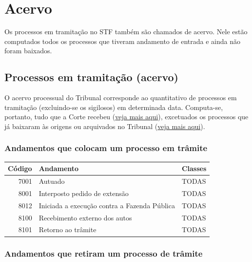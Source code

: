 \documentclass[
]{book}
\begin{document}
\hypertarget{acervo}{%
\chapter{Acervo}\label{acervo}}

Os processos em tramitação no STF também são chamados de acervo. Nele estão computados todos os processos que tiveram andamento de entrada e ainda não foram baixados.

\hypertarget{processos-em-tramitauxe7uxe3o-acervo}{%
\section{Processos em tramitação (acervo)}\label{processos-em-tramitauxe7uxe3o-acervo}}

O acervo processual do Tribunal corresponde ao quantitativo de processos em tramitação (excluindo-se os sigilosos) em determinada data. Computa-se, portanto, tudo que a Corte recebeu (\protect\hyperlink{recebimento}{veja mais aqui}), excetuados os processos que já baixaram às origens ou arquivados no Tribunal (\protect\hyperlink{baixados}{veja mais aqui}).

\hypertarget{andamentos-que-colocam-um-processo-em-truxe2mite}{%
\subsection{Andamentos que colocam um processo em trâmite}\label{andamentos-que-colocam-um-processo-em-truxe2mite}}

\begin{tabular}{r|l|l}
\hline
Código & Andamento & Classes\\
\hline
7001 & Autuado & TODAS\\
\hline
8001 & Interposto pedido de extensão & TODAS\\
\hline
8012 & Iniciada a execução contra a Fazenda Pública & TODAS\\
\hline
8100 & Recebimento externo dos autos & TODAS\\
\hline
8101 & Retorno ao trâmite & TODAS\\
\hline
\end{tabular}

\hypertarget{andamentos-que-retiram-um-processo-de-truxe2mite}{%
\subsection{Andamentos que retiram um processo de trâmite}\label{andamentos-que-retiram-um-processo-de-truxe2mite}}
\end{document}
